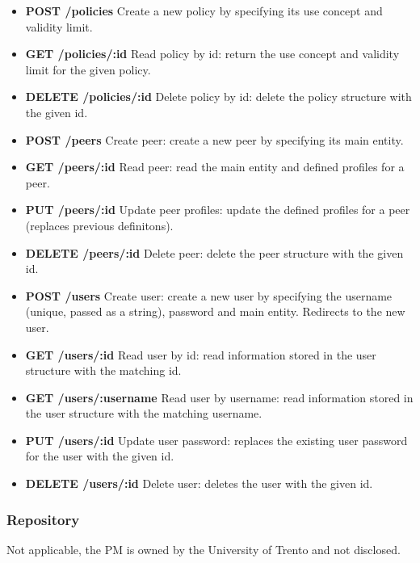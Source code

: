 \begin{itemize}
\item {\bf POST /policies} Create a new policy by specifying its use concept and validity limit.		
\item {\bf GET /policies/:id} Read policy by id: return the use concept and validity limit for the given policy.
\item {\bf DELETE /policies/:id} Delete policy by id: delete the policy structure with the given id.		
\item {\bf POST /peers}	Create peer: create a new peer by specifying its main entity.			
\item {\bf GET /peers/:id} Read peer: read the main entity and defined profiles for a peer.
\item {\bf PUT /peers/:id} Update peer profiles: update the defined profiles for a peer (replaces previous definitons).
\item {\bf DELETE /peers/:id} Delete peer: delete the peer structure with the given id.
\item {\bf POST /users}	Create user: create a new user by specifying the username (unique, passed as a string), password and main entity. Redirects to the new user. 											
\item {\bf GET /users/:id} Read user by id: read information stored in the user structure with the matching id.											
\item {\bf GET /users/:username} Read user by username: read information stored in the user structure with the matching username.		
\item {\bf PUT /users/:id} Update user password: replaces the existing user password for the user with the given id. 
\item {\bf DELETE /users/:id} Delete user: deletes the user with the given id.
\end{itemize}
\subsubsection{Repository}
Not applicable, the PM is owned by the University of Trento and not disclosed. 